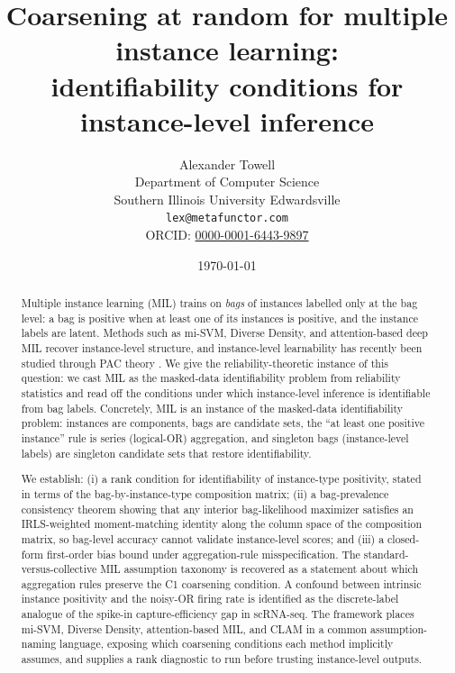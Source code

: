 \documentclass[11pt,letterpaper]{article}
\title{Coarsening at random for multiple instance learning:\\
       identifiability conditions for instance-level inference}
\author{
  Alexander Towell \\
  Department of Computer Science \\
  Southern Illinois University Edwardsville \\
  \texttt{lex@metafunctor.com} \\
  ORCID: \href{https://orcid.org/0000-0001-6443-9897}{0000-0001-6443-9897}
}
\date{\today}
\theoremstyle{plain}
\theoremstyle{definition}
\theoremstyle{remark}
\newcommand{\1}{\mathbf{1}}
\begin{document}
\maketitle

\begin{abstract}
Multiple instance learning (MIL) trains on \emph{bags} of instances
labelled only at the bag level: a bag is positive when at least one
of its instances is positive, and the instance labels are latent.
Methods such as mi-SVM, Diverse Density, and attention-based deep MIL
recover instance-level structure, and instance-level learnability has
recently been studied through PAC theory \citep{jang2024learnable}. We
give the reliability-theoretic instance of this question: we cast MIL
as the masked-data identifiability problem from reliability statistics
and read off the conditions under which instance-level inference is
identifiable from bag labels. Concretely, MIL is an instance of the
masked-data identifiability problem:
instances are components, bags are candidate sets, the ``at least
one positive instance'' rule is series (logical-OR) aggregation, and
singleton bags (instance-level labels) are singleton candidate sets
that restore identifiability.

We establish: (i) a rank condition for identifiability of
instance-type positivity, stated in terms of the
bag-by-instance-type composition matrix; (ii) a bag-prevalence
consistency theorem showing that any interior bag-likelihood
maximizer satisfies an IRLS-weighted moment-matching identity
along the column space of the composition matrix, so bag-level
accuracy cannot validate instance-level scores; and (iii) a
closed-form first-order bias bound under aggregation-rule
misspecification. The standard-versus-collective MIL assumption
taxonomy is recovered as a statement about which aggregation rules
preserve the C1 coarsening condition. A confound between intrinsic
instance positivity and the noisy-OR firing rate is identified as
the discrete-label analogue of the spike-in capture-efficiency gap
in scRNA-seq. The framework places mi-SVM, Diverse Density,
attention-based MIL, and CLAM in a common assumption-naming language,
exposing which coarsening conditions each method implicitly assumes,
and supplies a rank diagnostic to run before trusting instance-level
outputs.
\end{abstract}














\end{document}

